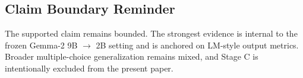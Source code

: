\subsection{Claim Boundary Reminder}

The supported claim remains bounded. The strongest evidence is internal to the frozen Gemma-2 9B $\rightarrow$ 2B setting and is anchored on LM-style output metrics. Broader multiple-choice generalization remains mixed, and Stage C is intentionally excluded from the present paper.
